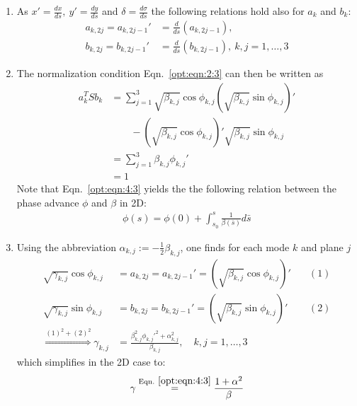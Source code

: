 \documentclass[english]{article}
\begin{document}
\begin{enumerate}
\item As $x'=\frac{dx}{ds},\ y'=\frac{dy}{ds}$ and $\delta=\frac{d\sigma}{ds}$ the following relations hold also for $a_k$ and $b_k$:
\begin{align}
a_{k,2j}=a_{k,2j-1}'&=\frac{d}{ds}(a_{k,2j-1}), \\
b_{k,2j}=b_{k,2j-1}'&=\frac{d}{ds}(b_{k,2j-1}),\ k,j=1,\ldots,3 
\end{align}
\item The normalization condition Eqn.~\ref{opt:eqn:2:3} can then be written as
\begin{align}
a_k^TSb_k&=\sum_{j=1}^3\sqrt{\beta_{k,j}}\cos{\phi_{k,j}}\left(\sqrt{\beta_{k,j}}\sin{\phi_{k,j}}\right)'\nonumber\\
& \qquad -\left(\sqrt{\beta_{k,j}}\cos{\phi_{k,j}}\right)'\sqrt{\beta_{k,j}}\sin{\phi_{k,j}}\nonumber\\
&=\sum_{j=1}^3\beta_{k,j}\phi_{k,j}'\nonumber\\
&=1 \label{opt:eqn:4:3}
\end{align}
Note that Eqn.~\ref{opt:eqn:4:3} yields the the following relation between the phase advance $\phi$ and $\beta$ in 2D:
\begin{align}
\phi(s)=\phi(0)+\int_{s_0}^s\frac{1}{\beta(\bar s)}d\bar s
\end{align}
\item Using the abbreviation $\alpha_{k,j}:=-\frac{1}{2}\beta_{k,j}$, one finds for each mode $k$ and plane $j$
\begin{align}
\sqrt{\gamma_{k,j}}\cos{\phi_{k,j}}&=a_{k,2j}=a_{k,2j-1}'=(\sqrt{\beta_{k,j}}\cos{\phi_{k,j}})' &\quad (1)\nonumber\\
\sqrt{\gamma_{k,j}}\sin{\phi_{k,j}}&=b_{k,2j}=b_{k,2j-1}'=(\sqrt{\beta_{k,j}}\sin{\phi_{k,j}})' &\quad (2)\nonumber\\
\overset{(1)^2+(2)^2}{\Rightarrow} \gamma_{k,j}&=\frac{\beta_{k,j}^2\phi_{k,j}'^2+\alpha_{k,j}^2}{\beta_{k,j}}, \quad k,j=1,\ldots,3 &
\end{align}
which simplifies in the 2D case to:
\begin{align}
\gamma\overset{\rm Eqn.~\ref{opt:eqn:4:3}}{=}\frac{1+\alpha^2}{\beta}
\end{align}
\end{enumerate}
\end{document}
